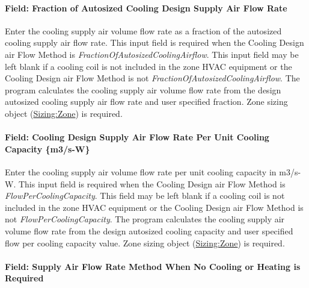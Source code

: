 \paragraph{Field: Fraction of Autosized Cooling Design Supply Air Flow Rate}\label{field-fraction-of-autosized-cooling-design-supply-air-flow-rate}

Enter the cooling supply air volume flow rate as a fraction of the autosized cooling supply air flow rate. This input field is required when the Cooling Design air Flow Method is \emph{FractionOfAutosizedCoolingAirflow}. This input field may be left blank if a cooling coil is not included in the zone HVAC equipment or the Cooling Design air Flow Method is not \emph{FractionOfAutosizedCoolingAirflow}. The program calculates the cooling supply air volume flow rate from the design autosized cooling supply air flow rate and user specified fraction. Zone sizing object (\hyperref[sizingzone]{Sizing:Zone}) is required.

\paragraph{Field: Cooling Design Supply Air Flow Rate Per Unit Cooling Capacity \{m3/s-W\}}\label{field-cooling-design-supply-air-flow-rate-per-unit-cooling-capacity-m3s-w}

Enter the cooling supply air volume flow rate per unit cooling capacity in m3/s-W. This input field is required when the Cooling Design air Flow Method is \emph{FlowPerCoolingCapacity}. This field may be left blank if a cooling coil is not included in the zone HVAC equipment or the Cooling Design air Flow Method is not \emph{FlowPerCoolingCapacity}. The program calculates the cooling supply air volume flow rate from the design autosized cooling capacity and user specified flow per cooling capacity value. Zone sizing object (\hyperref[sizingzone]{Sizing:Zone}) is required.

\paragraph{Field: Supply Air Flow Rate Method When No Cooling or Heating is Required}\label{field-supply-air-flow-rate-method-when-no-cooling-or-heating-is-required}

